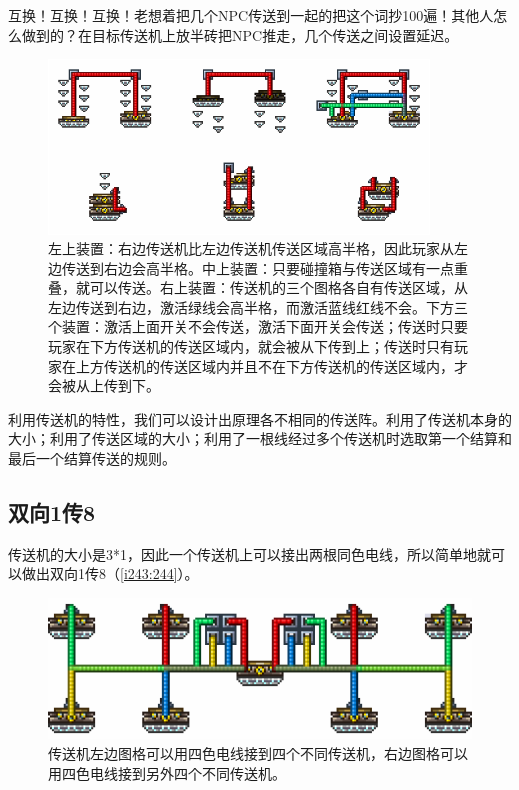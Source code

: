 \begin{remark}
互换！{\LARGE 互换！}{\huge 互换！}老想着把几个NPC传送到一起的把这个词抄100遍！其他人怎么做到的？在目标传送机上放半砖把NPC推走，几个传送之间设置延迟。
\end{remark}

\begin{figure}[!ht]
\begin{center}
\includegraphics[width=0.9\textwidth]{images/218.png}
\end{center}
\caption{左上装置：右边传送机比左边传送机传送区域高半格，因此玩家从左边传送到右边会高半格。中上装置：只要碰撞箱与传送区域有一点重叠，就可以传送。右上装置：传送机的三个图格各自有传送区域，从左边传送到右边，激活绿线会高半格，而激活蓝线红线不会。下方三个装置：激活上面开关不会传送，激活下面开关会传送；传送时只要玩家在下方传送机的传送区域内，就会被从下传到上；传送时只有玩家在上方传送机的传送区域内并且不在下方传送机的传送区域内，才会被从上传到下。}
\label{i217:218}
\end{figure}

利用传送机的特性，我们可以设计出原理各不相同的传送阵。利用了传送机本身的大小；利用了传送区域的大小；利用了一根线经过多个传送机时选取第一个结算和最后一个结算传送的规则。

\subsection{双向1传8}\label{sec11}
传送机的大小是3*1，因此一个传送机上可以接出两根同色电线，所以简单地就可以做出双向1传8（\autoref{i243:244}）。

\begin{figure}[!ht]
\centering
\includegraphics{images/244.png}
\caption{传送机左边图格可以用四色电线接到四个不同传送机，右边图格可以用四色电线接到另外四个不同传送机。}
\label{i243:244}
\end{figure}

